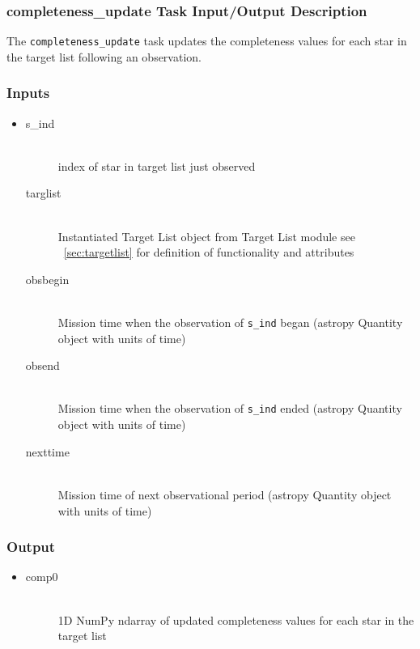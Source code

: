 \documentclass[cleanfoot]{asme2ej}
\begin{document}
\subsubsection{completeness\_update Task Input/Output Description}
\label{sec:completenessupdatetask}
The \verb+completeness_update+ task updates the completeness values for each star in the target list following an observation.

\subsubsection*{Inputs}
\begin{itemize}
    \item 
    \begin{description}
        \item[s\_ind] \hfill \\
        index of star in target list just observed
        \item[targlist] \hfill \\
        Instantiated Target List object from Target List module see ~\ref{sec:targetlist} for definition of functionality and attributes
        \item[obsbegin] \hfill \\
        Mission time when the observation of \verb+s_ind+ began (astropy Quantity object with units of time)
        \item[obsend] \hfill \\
        Mission time when the observation of \verb+s_ind+ ended (astropy Quantity object with units of time)
        \item[nexttime] \hfill \\
        Mission time of next observational period (astropy Quantity object with units of time)
    \end{description}
\end{itemize}

\subsubsection*{Output}
\begin{itemize}
    \item 
    \begin{description}
        \item[comp0] \hfill \\
        1D NumPy ndarray of updated completeness values for each star in the target list
    \end{description}
\end{itemize}
\end{document}
